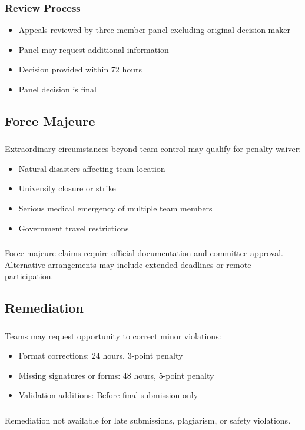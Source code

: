\subsubsection{Review Process}
\begin{itemize}[noitemsep]
    \item Appeals reviewed by three-member panel excluding original decision maker
    \item Panel may request additional information
    \item Decision provided within 72 hours
    \item Panel decision is final
\end{itemize}

\subsection{Force Majeure}

\subsubsection{}
Extraordinary circumstances beyond team control may qualify for penalty waiver:
\begin{itemize}[noitemsep]
    \item Natural disasters affecting team location
    \item University closure or strike
    \item Serious medical emergency of multiple team members
    \item Government travel restrictions
\end{itemize}

\subsubsection{}
Force majeure claims require official documentation and committee approval. Alternative arrangements may include extended deadlines or remote participation.

\subsection{Remediation}

\subsubsection{}
Teams may request opportunity to correct minor violations:
\begin{itemize}[noitemsep]
    \item Format corrections: 24 hours, 3-point penalty
    \item Missing signatures or forms: 48 hours, 5-point penalty
    \item Validation additions: Before final submission only
\end{itemize}

\subsubsection{}
Remediation not available for late submissions, plagiarism, or safety violations.